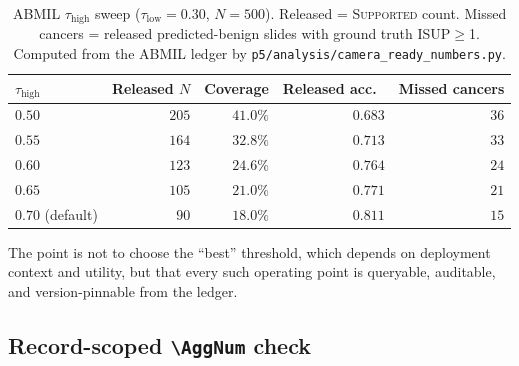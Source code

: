 \documentclass{article}
\newcommand{\SafeNum}[1]{#1}
\newcommand{\AggNum}[2]{#2}
\begin{document}
\begin{table}[h]
\centering
\caption{ABMIL $\tau_{\text{high}}$ sweep ($\tau_{\text{low}}=\SafeNum{0.30}$, $N=\SafeNum{500}$). Released = \textsc{Supported} count. Missed cancers = released predicted-benign slides with ground truth ISUP$\ge$1. Computed from the ABMIL ledger by \texttt{p5/analysis/camera\_ready\_numbers.py}.}
\label{tab:abmil-sweep}
\setlength{\tabcolsep}{5pt}
\small
\begin{tabular}{@{}lrrrr@{}}
\toprule
$\tau_{\text{high}}$ & Released $N$ & Coverage & Released acc.\ & Missed cancers \\
\midrule
$\SafeNum{0.50}$ & $\AggNum{abmil.sweep.tau050.released_n}{205}$ & $\AggNum{abmil.sweep.tau050.coverage_pct}{41.0}\%$ & $\AggNum{abmil.sweep.tau050.acc}{0.683}$ & $\AggNum{abmil.sweep.tau050.missed_cancer}{36}$ \\
$\SafeNum{0.55}$ & $\AggNum{abmil.sweep.tau055.released_n}{164}$ & $\AggNum{abmil.sweep.tau055.coverage_pct}{32.8}\%$ & $\AggNum{abmil.sweep.tau055.acc}{0.713}$ & $\AggNum{abmil.sweep.tau055.missed_cancer}{33}$ \\
$\SafeNum{0.60}$ & $\AggNum{abmil.sweep.tau060.released_n}{123}$ & $\AggNum{abmil.sweep.tau060.coverage_pct}{24.6}\%$ & $\AggNum{abmil.sweep.tau060.acc}{0.764}$ & $\AggNum{abmil.sweep.tau060.missed_cancer}{24}$ \\
$\SafeNum{0.65}$ & $\AggNum{abmil.sweep.tau065.released_n}{105}$ & $\AggNum{abmil.sweep.tau065.coverage_pct}{21.0}\%$ & $\AggNum{abmil.sweep.tau065.acc}{0.771}$ & $\AggNum{abmil.sweep.tau065.missed_cancer}{21}$ \\
$\SafeNum{0.70}$ (default) & $\AggNum{abmil.supported.n}{90}$ & $\AggNum{abmil.sweep.tau070.coverage_pct}{18.0}\%$ & $\AggNum{abmil.supported.acc}{0.811}$ & $\AggNum{abmil.supported.missed_cancer}{15}$ \\
\bottomrule
\end{tabular}
\end{table}

The point is not to choose the ``best'' threshold, which depends on deployment context and utility, but that every such operating point is queryable, auditable, and version-pinnable from the ledger.

\subsection*{Record-scoped \texttt{\textbackslash AggNum} check}
\end{document}
